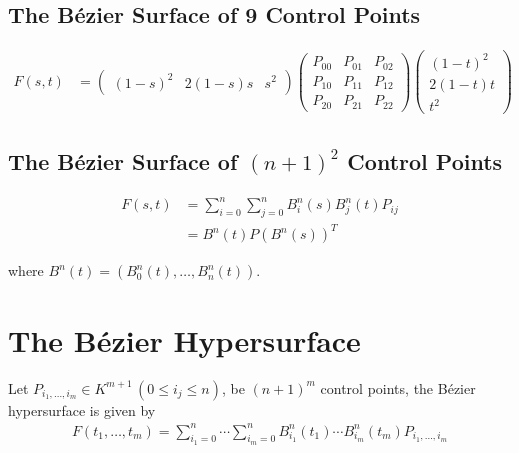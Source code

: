 \documentclass{article}
\def\mat#1{\left(\begin{matrix}#1\end{matrix}\right)}
\begin{document}
\subsection{The Bézier Surface of 9 Control Points}
\begin{align*}
    F(s, t) &=
        \mat{(1 - s)^2 & 2(1 - s) s & s^2}
        \mat{P_{00} & P_{01} & P_{02} \\
            P_{10} & P_{11} & P_{12} \\
            P_{20} & P_{21} & P_{22}}
        \mat{(1 - t)^2 \\ 2(1 - t)t \\ t^2}
\end{align*}


\subsection{The Bézier Surface of $(n + 1)^2$ Control Points}
\begin{align*}
    F(s, t) &= \sum_{i=0}^n \sum_{j=0}^n B^n_i (s) B^n_j (t) P_{ij} \\
        &= B^n(t) P (B^n(s))^T
\end{align*}

where $B^n(t) = (B^n_0(t), \dots, B^n_n(t))$.

\section{The Bézier Hypersurface}
Let $P_{i_1, \dots, i_m} \in K^{m + 1} \, (0 \leq i_j \leq n)$, be $(n + 1)^m$ control points,
the Bézier hypersurface is given by
\begin{align*}
    F(t_1, \dots, t_m) = \sum^n_{i_1 = 0} \cdots \sum^n_{i_m = 0} B^n_{i_1} (t_1) \cdots B^n_{i_m} (t_m) P_{i_1, \dots, i_m}
\end{align*}
\end{document}
